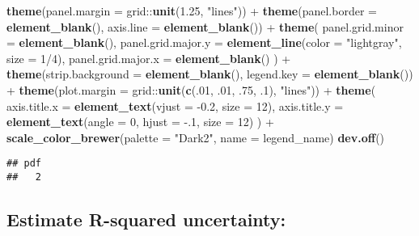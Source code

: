 \documentclass[11pt,]{article}
\newenvironment{Shaded}{\begin{snugshade}}{\end{snugshade}}
\newcommand{\KeywordTok}[1]{\textcolor[rgb]{0.13,0.29,0.53}{\textbf{{#1}}}}
\newcommand{\DataTypeTok}[1]{\textcolor[rgb]{0.13,0.29,0.53}{{#1}}}
\newcommand{\DecValTok}[1]{\textcolor[rgb]{0.00,0.00,0.81}{{#1}}}
\newcommand{\FloatTok}[1]{\textcolor[rgb]{0.00,0.00,0.81}{{#1}}}
\newcommand{\StringTok}[1]{\textcolor[rgb]{0.31,0.60,0.02}{{#1}}}
\newcommand{\NormalTok}[1]{{#1}}
\begin{document}
\begin{Shaded}
\begin{Highlighting}[]
\StringTok{  }\KeywordTok{theme}\NormalTok{(}\DataTypeTok{panel.margin =} \NormalTok{grid::}\KeywordTok{unit}\NormalTok{(}\FloatTok{1.25}\NormalTok{, }\StringTok{"lines"}\NormalTok{)) +}\StringTok{ }
\StringTok{  }\KeywordTok{theme}\NormalTok{(}\DataTypeTok{panel.border =} \KeywordTok{element_blank}\NormalTok{(), }\DataTypeTok{axis.line =} \KeywordTok{element_blank}\NormalTok{()) +}\StringTok{ }
\StringTok{  }\KeywordTok{theme}\NormalTok{(}
    \DataTypeTok{panel.grid.minor =} \KeywordTok{element_blank}\NormalTok{(), }
    \DataTypeTok{panel.grid.major.y =} \KeywordTok{element_line}\NormalTok{(}\DataTypeTok{color =} \StringTok{"lightgray"}\NormalTok{, }\DataTypeTok{size =} \DecValTok{1}\NormalTok{/}\DecValTok{4}\NormalTok{), }
    \DataTypeTok{panel.grid.major.x =} \KeywordTok{element_blank}\NormalTok{()}
  \NormalTok{) +}\StringTok{ }
\StringTok{  }\KeywordTok{theme}\NormalTok{(}\DataTypeTok{strip.background =} \KeywordTok{element_blank}\NormalTok{(), }\DataTypeTok{legend.key =} \KeywordTok{element_blank}\NormalTok{()) +}\StringTok{ }
\StringTok{  }\KeywordTok{theme}\NormalTok{(}\DataTypeTok{plot.margin =} \NormalTok{grid::}\KeywordTok{unit}\NormalTok{(}\KeywordTok{c}\NormalTok{(.}\DecValTok{01}\NormalTok{, .}\DecValTok{01}\NormalTok{, .}\DecValTok{75}\NormalTok{, .}\DecValTok{1}\NormalTok{), }\StringTok{"lines"}\NormalTok{)) +}\StringTok{ }
\StringTok{  }\KeywordTok{theme}\NormalTok{(}
    \DataTypeTok{axis.title.x =} \KeywordTok{element_text}\NormalTok{(}\DataTypeTok{vjust =} \NormalTok{-}\FloatTok{0.2}\NormalTok{, }\DataTypeTok{size =} \DecValTok{12}\NormalTok{), }
    \DataTypeTok{axis.title.y =} \KeywordTok{element_text}\NormalTok{(}\DataTypeTok{angle =} \DecValTok{0}\NormalTok{, }\DataTypeTok{hjust =} \NormalTok{-.}\DecValTok{1}\NormalTok{, }\DataTypeTok{size =} \DecValTok{12}\NormalTok{)}
  \NormalTok{) +}\StringTok{ }
\StringTok{  }\KeywordTok{scale_color_brewer}\NormalTok{(}\DataTypeTok{palette =} \StringTok{"Dark2"}\NormalTok{, }\DataTypeTok{name =} \NormalTok{legend_name)}
\KeywordTok{dev.off}\NormalTok{()}
\end{Highlighting}
\end{Shaded}

\begin{verbatim}
## pdf 
##   2
\end{verbatim}

\subsection{Estimate R-squared
uncertainty:}\label{estimate-r-squared-uncertainty}
\end{document}
